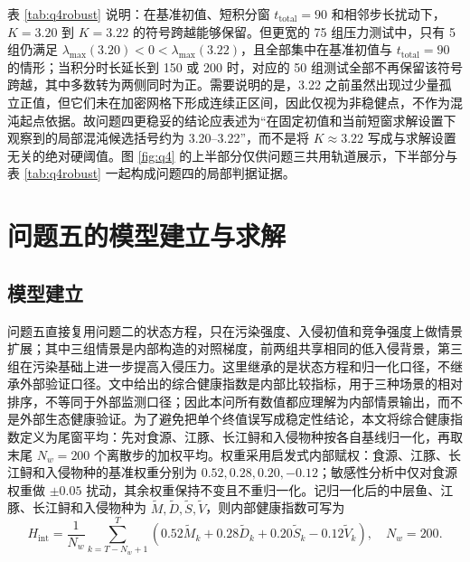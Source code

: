 \documentclass{MMCStyle}
\begin{document}
表 \ref{tab:q4robust} 说明：在基准初值、短积分窗 $t_{\text{total}}=90$ 和相邻步长扰动下，$K=3.20$ 到 $K=3.22$ 的符号跨越能够保留。但更宽的 75 组压力测试中，只有 5 组仍满足 $\lambda_{\max}(3.20)<0<\lambda_{\max}(3.22)$，且全部集中在基准初值与 $t_{\text{total}}=90$ 的情形；当积分时长延长到 150 或 200 时，对应的 50 组测试全部不再保留该符号跨越，其中多数转为两侧同时为正。需要说明的是，3.22 之前虽然出现过少量孤立正值，但它们未在加密网格下形成连续正区间，因此仅视为非稳健点，不作为混沌起点依据。故问题四更稳妥的结论应表述为“在固定初值和当前短窗求解设置下观察到的局部混沌候选括号约为 3.20--3.22”，而不是将 $K\approx 3.22$ 写成与求解设置无关的绝对硬阈值。图 \ref{fig:q4} 的上半部分仅供问题三共用轨道展示，下半部分与表 \ref{tab:q4robust} 一起构成问题四的局部判据证据。

\section{问题五的模型建立与求解}
\subsection{模型建立}
问题五直接复用问题二的状态方程，只在污染强度、入侵初值和竞争强度上做情景扩展；其中三组情景是内部构造的对照梯度，前两组共享相同的低入侵背景，第三组在污染基础上进一步提高入侵压力。这里继承的是状态方程和归一化口径，不继承外部验证口径。文中给出的综合健康指数是内部比较指标，用于三种场景的相对排序，不等同于外部监测口径；因此本问所有数值都应理解为内部情景输出，而不是外部生态健康验证。为了避免把单个终值误写成稳定性结论，本文将综合健康指数定义为尾窗平均：先对食源、江豚、长江鲟和入侵物种按各自基线归一化，再取末尾 $N_w=200$ 个离散步的加权平均。权重采用启发式内部赋权：食源、江豚、长江鲟和入侵物种的基准权重分别为 $0.52,0.28,0.20,-0.12$；敏感性分析中仅对食源权重做 $\pm 0.05$ 扰动，其余权重保持不变且不重归一化。记归一化后的中层鱼、江豚、长江鲟和入侵物种为 $\tilde M,\tilde D,\tilde S,\tilde V$，则内部健康指数可写为
\begin{equation}
H_{\text{int}}=\frac{1}{N_w}\sum_{k=T-N_w+1}^{T}\left(0.52\tilde M_k+0.28\tilde D_k+0.20\tilde S_k-0.12\tilde V_k\right),\quad N_w=200.
\end{equation}
\end{document}
